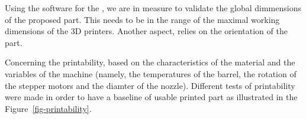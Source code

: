 \documentclass[
  11pt,
]{article}
\begin{document}
Using the software for the , we are in measure to validate the global
dimmensions of the proposed part. This needs to be in the range of the
maximal working dimensions of the 3D printers. Another aspect, relies on
the orientation of the part.

Concerning the printability, based on the characteristics of the
material and the variables of the machine (namely, the temperatures of
the barrel, the rotation of the stepper motors and the diamter of the
nozzle). Different tests of printability were made in order to have a
baseline of usable printed part as illustrated in the
Figure~\ref{fig-printability}.

\begin{figure}

\begin{minipage}[t]{\linewidth}

{\centering 


}

\end{minipage}%
\newline
\begin{minipage}[t]{\linewidth}

{\centering 

}
\end{minipage}
\end{figure}
\end{document}
